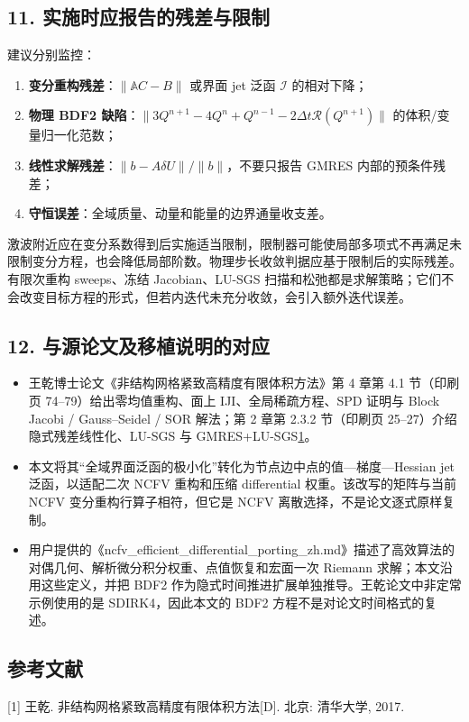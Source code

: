 \documentclass[
  12pt,
  UTF8]{ctexart}
\providecommand{\tightlist}{%
  \setlength{\itemsep}{0pt}\setlength{\parskip}{0pt}}
\begin{document}
\hypertarget{ux5b9eux65bdux65f6ux5e94ux62a5ux544aux7684ux6b8bux5deeux4e0eux9650ux5236}{%
\subsection{11.
实施时应报告的残差与限制}\label{ux5b9eux65bdux65f6ux5e94ux62a5ux544aux7684ux6b8bux5deeux4e0eux9650ux5236}}

建议分别监控：

\begin{enumerate}
\def\labelenumi{\arabic{enumi}.}
\tightlist
\item
  \textbf{变分重构残差}：\(\|\mathbb A C-B\|\) 或界面 jet 泛函
  \(\mathcal I\) 的相对下降；
\item
  \textbf{物理 BDF2
  缺陷}：\(\|3Q^{n+1}-4Q^n+Q^{n-1}-2\Delta t\mathcal R(Q^{n+1})\|\)
  的体积/变量归一化范数；
\item
  \textbf{线性求解残差}：\(\|b-A\delta U\|/\|b\|\)，不要只报告 GMRES
  内部的预条件残差；
\item
  \textbf{守恒误差}：全域质量、动量和能量的边界通量收支差。
\end{enumerate}

激波附近应在变分系数得到后实施适当限制，限制器可能使局部多项式不再满足未限制变分方程，也会降低局部阶数。物理步长收敛判据应基于限制后的实际残差。有限次重构
sweeps、冻结 Jacobian、LU-SGS
扫描和松弛都是求解策略；它们不会改变目标方程的形式，但若内迭代未充分收敛，会引入额外迭代误差。

\hypertarget{ux4e0eux6e90ux8bbaux6587ux53caux79fbux690dux8bf4ux660eux7684ux5bf9ux5e94}{%
\subsection{12.
与源论文及移植说明的对应}\label{ux4e0eux6e90ux8bbaux6587ux53caux79fbux690dux8bf4ux660eux7684ux5bf9ux5e94}}

\begin{itemize}
\tightlist
\item
  王乾博士论文《非结构网格紧致高精度有限体积方法》第 4 章第 4.1
  节（印刷页 74--79）给出零均值重构、面上 IJI、全局稀疏方程、SPD 证明与
  Block Jacobi / Gauss--Seidel / SOR 解法；第 2 章第 2.3.2 节（印刷页
  25--27）介绍隐式残差线性化、LU-SGS 与
  GMRES+LU-SGS\protect\hyperlink{ref_001}{1}。
\item
  本文将其``全域界面泛函的极小化''转化为节点边中点的值---梯度---Hessian
  jet 泛函，以适配二次 NCFV 重构和压缩 differential
  权重。该改写的矩阵与当前 NCFV 变分重构行算子相符，但它是 NCFV
  离散选择，不是论文逐式原样复制。
\item
  用户提供的《ncfv\_efficient\_differential\_porting\_zh.md》描述了高效算法的对偶几何、解析微分积分权重、点值恢复和宏面一次
  Riemann 求解；本文沿用这些定义，并把 BDF2
  作为隐式时间推进扩展单独推导。王乾论文中非定常示例使用的是
  SDIRK4，因此本文的 BDF2 方程不是对论文时间格式的复述。
\end{itemize}

\hypertarget{ux53c2ux8003ux6587ux732e}{%
\subsection{参考文献}\label{ux53c2ux8003ux6587ux732e}}

\protect\hypertarget{ref_001}{}{}{[}1{]} 王乾.
非结构网格紧致高精度有限体积方法{[}D{]}. 北京: 清华大学, 2017.
\end{document}
